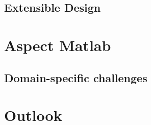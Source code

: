\documentclass{beamer}
\begin{document}
\subsection{Extensible Design}  %

\section{Aspect Matlab} %



\subsection{Domain-specific challenges} %

\section{Outlook} %

\begin{frame}
  
\end{frame}
\end{document}
